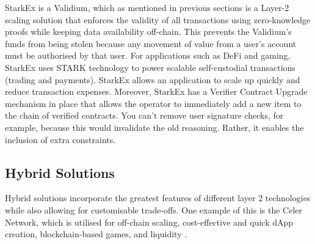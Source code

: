 StarkEx \cite{noauthor_starkex_nodate} is a Validium, which as mentioned in previous sections is a Layer-2 scaling solution that enforces the validity of all transactions using zero-knowledge proofs while keeping data availability off-chain. This prevents the Validium's funds from being stolen because any movement of value from a user's account must be authorised by that user.
For applications such as DeFi and gaming, StarkEx uses STARK technology to power scalable self-custodial transactions (trading and payments). StarkEx allows an application to scale up quickly and reduce transaction expenses. Moreover, StarkEx has a Verifier Contract Upgrade mechanism in place that allows the operator to immediately add a new item to the chain of verified contracts. You can't remove user signature checks, for example, because this would invalidate the old reasoning. Rather, it enables the inclusion of extra constraints\cite{noauthor_introduction_nodate}.

\subsection{Hybrid Solutions}

Hybrid solutions incorporate the greatest features of different layer 2 technologies while also allowing for customisable trade-offs. One example of this is the Celer Network, which is utilised for off-chain scaling, cost-effective and quick dApp creation, blockchain-based games, and liquidity \cite{noauthor_layer_nodate}.

